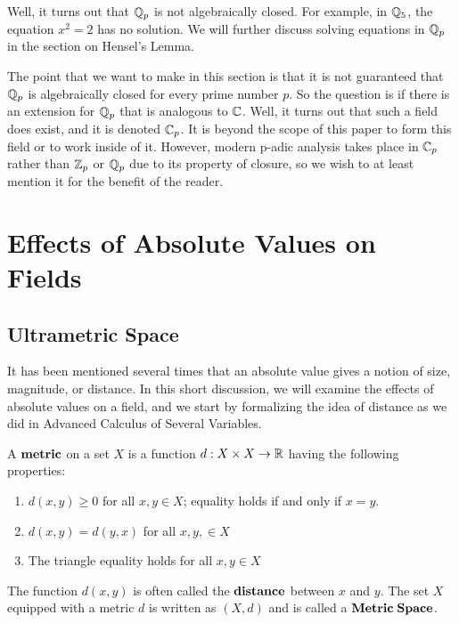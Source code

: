 \documentclass[a4paper]{article}
\begin{document}
Well, it turns out that $\mathbb Q_p$ is not algebraically closed.  For
example, in $\mathbb Q_5$, the equation $x^2=2$ has no solution.  We will
further discuss solving equations in $\mathbb Q_p$ in the section on
Hensel's Lemma.  

The point that we want to make in this section is that it is not
guaranteed that $\mathbb Q_p$ is algebraically closed for every prime
number $p$.  So the question is if there is an extension for $\mathbb Q_p$ 
that is analogous to $\mathbb C$.  Well, it turns out that such a field 
does exist, and it is denoted $\mathbb C_p$.  It is beyond the scope of
this paper to form this field or to work inside of it.  However,
modern p-adic analysis takes place in $\mathbb C_p$ rather than $\mathbb Z_p$
or $\mathbb Q_p$ due to its property of closure, so we wish to at least
mention it for the benefit of the reader.

\section{Effects of Absolute Values on Fields}

\subsection{Ultrametric Space}

It has been mentioned several times that an absolute value gives a
notion of size, magnitude, or distance.  In this short discussion,
we will examine the effects of absolute values on a field, and we
start by formalizing the idea of distance as we did in Advanced Calculus of Several Variables.

\begin{definition}[Metric]
A $\bf{metric}$ on a set $X$ is a function $d:X\times X\to\mathbb R$
having the following properties:
\begin{enumerate}
  \item $d(x,y)\geq 0$ for all $x,y\in X$; equality holds if and 
  only if $x=y$.
  \item $d(x,y)=d(y,x)$ for all $x,y,\in X$
  \item The triangle equality holds for all $x,y\in X$
\end{enumerate}

The function $d(x,y)$ is often called the $\bf{distance}$ between $x$
and $y$.  The set $X$ equipped with a metric $d$ is written as $(X,d)$
and is called a $\bf{Metric\;Space}$.
\end{definition}
\end{document}
